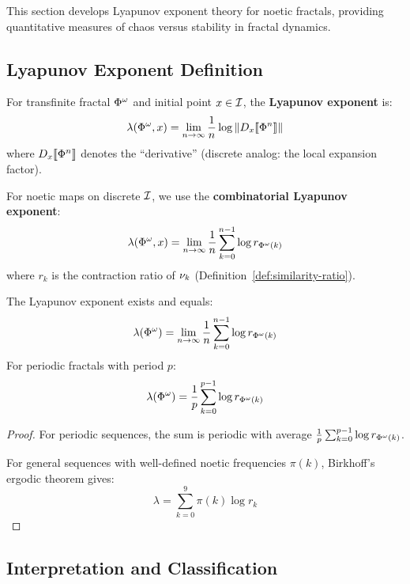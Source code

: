 \begin{tcolorbox}[colback=blue!5!white,colframe=blue!75!black,title=\vnewthree]
This section develops Lyapunov exponent theory for noetic fractals, providing quantitative measures of chaos versus stability in fractal dynamics.
\end{tcolorbox}

\subsection{Lyapunov Exponent Definition}

\begin{definition}
\label{def:lyapunov-exponent-ch5}
For transfinite fractal $\Phi^{\omega}$ and initial point $x \in \mathcal{I}$, the \textbf{Lyapunov exponent} is:
\[
\lambda(\Phi^{\omega}, x) = \lim_{n \to \infty} \frac{1}{n} \log \|D_x \llbracket \Phi^{n} \rrbracket\|
\]
where $D_x \llbracket \Phi^{n} \rrbracket$ denotes the ``derivative'' (discrete analog: the local expansion factor).

For noetic maps on discrete $\mathcal{I}$, we use the \textbf{combinatorial Lyapunov exponent}:
\[
\lambda(\Phi^{\omega}, x) = \lim_{n \to \infty} \frac{1}{n} \sum_{k=0}^{n-1} \log r_{\Phi^{\omega}(k)}
\]
where $r_k$ is the contraction ratio of $\nu_{k}$ (Definition~\ref{def:similarity-ratio}).
\end{definition}

\begin{proposition}
\label{prop:lyapunov-existence}
The Lyapunov exponent exists and equals:
\[
\lambda(\Phi^{\omega}) = \lim_{n \to \infty} \frac{1}{n} \sum_{k=0}^{n-1} \log r_{\Phi^{\omega}(k)}
\]
For periodic fractals with period $p$:
\[
\lambda(\Phi^{\omega}) = \frac{1}{p} \sum_{k=0}^{p-1} \log r_{\Phi^{\omega}(k)}
\]
\end{proposition}

\begin{proof}
For periodic sequences, the sum is periodic with average $\frac{1}{p} \sum_{k=0}^{p-1} \log r_{\Phi^{\omega}(k)}$.

For general sequences with well-defined noetic frequencies $\pi(k)$, Birkhoff's ergodic theorem gives:
\[
\lambda = \sum_{k=0}^{9} \pi(k) \log r_k
\]
\end{proof}

\subsection{Interpretation and Classification}

